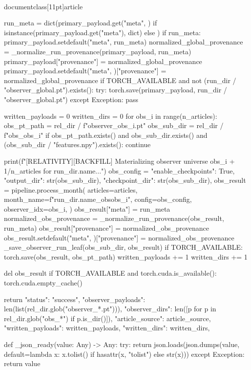 \\documentclass[11pt]{article}
\begin{document}
\begin{CodeBlock}
    run_meta = dict(primary_payload.get("meta", {}) if isinstance(primary_payload.get("meta"), dict) else {})
    if run_meta:
        primary_payload.setdefault("meta", run_meta)
    normalized_global_provenance = _normalize_run_provenance(primary_payload, run_meta)
    primary_payload["provenance"] = normalized_global_provenance
    primary_payload.setdefault("meta", {})["provenance"] = normalized_global_provenance
    if TORCH_AVAILABLE and not (run_dir / "observer_global.pt").exists():
        try:
            torch.save(primary_payload, run_dir / "observer_global.pt")
        except Exception:
            pass

    written_payloads = 0
    written_dirs = 0
    for obs_i in range(n_articles):
        obs_pt_path = rel_dir / f"observer_{obs_i}.pt"
        obs_sub_dir = rel_dir / f"obs_{obs_i}"
        if obs_pt_path.exists() and obs_sub_dir.exists() and (obs_sub_dir / "features.npy").exists():
            continue

        print(f"[RELATIVITY][BACKFILL] Materializing observer universe {obs_i + 1}/{n_articles} for {run_dir.name}...")
        obs_config = {
            "enable_checkpoints": True,
            "output_dir": str(obs_sub_dir),
            "checkpoint_dir": str(obs_sub_dir),
        }
        obs_result = pipeline.process_month(
            articles=articles,
            month_name=f"{run_dir.name}_obs{obs_i}",
            config=obs_config,
            observer_idx=obs_i,
        )
        obs_result["meta"] = run_meta
        normalized_obs_provenance = _normalize_run_provenance(obs_result, run_meta)
        obs_result["provenance"] = normalized_obs_provenance
        obs_result.setdefault("meta", {})["provenance"] = normalized_obs_provenance
        _save_observer_run_leaf(obs_sub_dir, obs_result)
        if TORCH_AVAILABLE:
            torch.save(obs_result, obs_pt_path)
        written_payloads += 1
        written_dirs += 1

        del obs_result
        if TORCH_AVAILABLE and torch.cuda.is_available():
            torch.cuda.empty_cache()

    return {
        "status": "success",
        "observer_payloads": len(list(rel_dir.glob("observer_*.pt"))),
        "observer_dirs": len([p for p in rel_dir.glob("obs_*") if p.is_dir()]),
        "article_source": article_source,
        "written_payloads": written_payloads,
        "written_dirs": written_dirs,
    }


def _json_ready(value: Any) -> Any:
    try:
        return json.loads(json.dumps(value, default=lambda x: x.tolist() if hasattr(x, "tolist") else str(x)))
    except Exception:
        return value



\end{CodeBlock}
\end{document}
